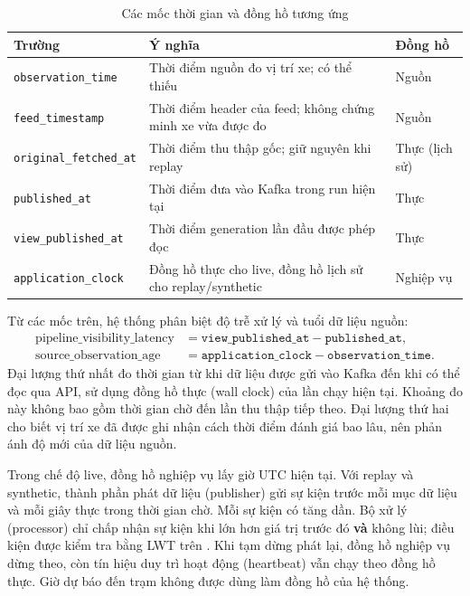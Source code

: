 \begin{table}[H]
\centering
\tablefont
\caption{Các mốc thời gian và đồng hồ tương ứng}
\label{tab:clocks}
\begin{tabular}{p{3.49cm}p{8.34cm}p{3.30cm}}
\toprule
\textbf{Trường} & \textbf{Ý nghĩa} & \textbf{Đồng hồ} \\
\midrule
\texttt{observation\_time} & Thời điểm nguồn đo vị trí xe; có thể thiếu & Nguồn \\
\texttt{feed\_timestamp} & Thời điểm header của feed; không chứng minh xe vừa được đo & Nguồn \\
\texttt{original\_fetched\_at} & Thời điểm thu thập gốc; giữ nguyên khi replay & Thực (lịch sử) \\
\texttt{published\_at} & Thời điểm đưa vào Kafka trong run hiện tại & Thực \\
\texttt{view\_published\_at} & Thời điểm generation lần đầu được phép đọc & Thực \\
\texttt{application\_clock} & Đồng hồ thực cho live, đồng hồ lịch sử cho replay/synthetic & Nghiệp vụ \\
\bottomrule
\end{tabular}
\end{table}

Từ các mốc trên, hệ thống phân biệt độ trễ xử lý và tuổi dữ liệu nguồn:
\begin{align}
\text{pipeline\_visibility\_latency} &= \texttt{view\_published\_at} - \texttt{published\_at}, \\
\text{source\_observation\_age} &= \texttt{application\_clock} - \texttt{observation\_time}.
\end{align}
Đại lượng thứ nhất đo thời gian từ khi dữ liệu được gửi vào Kafka đến khi có thể đọc qua API, sử dụng đồng hồ thực (wall clock) của lần chạy hiện tại. Khoảng đo này không bao gồm thời gian chờ đến lần thu thập tiếp theo. Đại lượng thứ hai cho biết vị trí xe đã được ghi nhận cách thời điểm đánh giá bao lâu, nên phản ánh độ mới của dữ liệu nguồn.

Trong chế độ live, đồng hồ nghiệp vụ lấy giờ UTC hiện tại. Với replay và synthetic, thành phần phát dữ liệu (publisher) gửi sự kiện  trước mỗi mục dữ liệu và mỗi giây thực trong thời gian chờ. Mỗi sự kiện có  tăng dần. Bộ xử lý (processor) chỉ chấp nhận sự kiện khi  lớn hơn giá trị trước đó \textbf{và}  không lùi; điều kiện được kiểm tra bằng LWT trên . Khi tạm dừng phát lại, đồng hồ nghiệp vụ dừng theo, còn tín hiệu duy trì hoạt động (heartbeat) vẫn chạy theo đồng hồ thực. Giờ dự báo đến trạm không được dùng làm đồng hồ của hệ thống.

